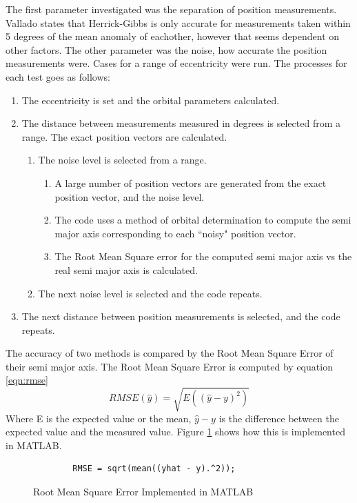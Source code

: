 \documentclass[12pt]{article}
\begin{document}
	The first parameter investigated was the separation of position measurements.  Vallado\cite{vallado2007fundamentals} states that Herrick-Gibbs is only accurate for measurements taken within 5 degrees of the mean anomaly of eachother, however that seems dependent on other factors. The other parameter was the noise, how accurate the position measurements were. Cases for a range of eccentricity were run. The processes for each test goes as follows:
	\begin{enumerate}
		\item The eccentricity is set and the orbital parameters calculated.
		\item The distance between measurements measured in degrees is selected from a range. The exact position vectors are calculated.
		\begin{enumerate}
			\item The noise level is selected from a range. 
			\begin{enumerate}
				\item A large number of position vectors are generated from the exact position vector, and the noise level.
				\item The code uses a method of orbital determination to compute the semi major axis corresponding to each ``noisy" position vector. 
				\item The Root Mean Square error for the computed semi major axis vs the real semi major axis is calculated. 

			\end{enumerate}
				\item The next noise level is selected and the code repeats.
		\end{enumerate}
		\item The next distance between position measurements is selected, and the code repeats.
	\end{enumerate}

	The accuracy of two methods is compared by the Root Mean Square Error of their semi major axis. The Root Mean Square Error is computed by equation \ref{eqn:rmse}
	\begin{equation}
	RMSE(\hat{y})=\sqrt{E\left(\left(\hat{y}-y\right)^2\right)}
	\label{eqn:rmse}
	\end{equation}
	Where E is the expected value or the mean, $\hat{y}-y$ is the difference between the expected value and the measured value. 
	Figure \ref{fig:RMS_MATLAB} shows how this is implemented in MATLAB. 
		\begin{figure}[H]
		\begin{lstlisting}
		RMSE = sqrt(mean((yhat - y).^2));
		\end{lstlisting}
		\caption{Root Mean Square Error Implemented in MATLAB}
		\label{fig:RMS_MATLAB}
	\end{figure}
	
\end{document}
